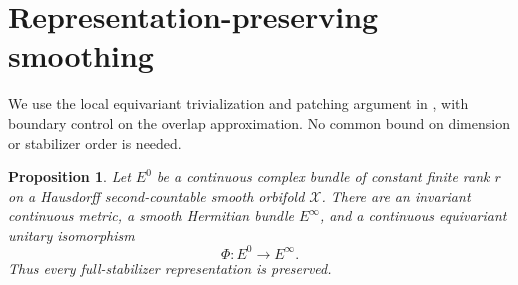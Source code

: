 \documentclass[11pt,a4paper,reqno]{amsart}
\numberwithin{equation}{section}
\newtheorem{proposition}[theorem]{Proposition}
\theoremstyle{remark}
\theoremstyle{plain}
\newcommand{\X}{\mathcal X}
\begin{document}
\section{Representation-preserving smoothing}\label{sec:smoothing}

We use the local equivariant trivialization and patching argument in
\cite[proof of Corollary~1.3]{Pardon}, with boundary control on the overlap
approximation. No common bound on dimension or stabilizer order is needed.

\begin{samepage}
\begin{proposition}\label{prop:smoothing}
Let $E^0$ be a continuous complex bundle of constant finite rank $r$ on a
Hausdorff second-countable smooth orbifold $\X$. There are an invariant
continuous metric, a smooth Hermitian bundle $E^\infty$, and a continuous
equivariant unitary isomorphism
\[
 \Phi:E^0\longrightarrow E^\infty.
\]
Thus every full-stabilizer representation is preserved.
\end{proposition}
\end{samepage}
\end{document}
